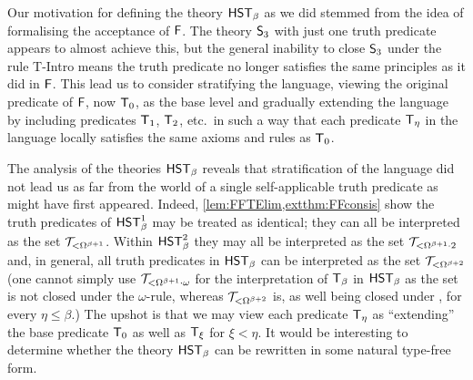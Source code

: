 \documentclass[UKenglish,cleveref,DIV=12]{scrartcl}
\theoremstyle{definition}
\theoremstyle{definition}
\begin{document}
Our motivation for defining the theory $\mathsf{HST}_\beta$ as we did stemmed from the
idea of formalising the acceptance of $\mathsf{F}$. The theory $\mathsf{S}_3$ with just one
truth predicate appears to almost achieve this, but the general inability
to close $\mathsf{S}_3$ under the rule T-Intro means the truth predicate no longer
satisfies the same principles as it did in $\mathsf{F}$. This lead us to consider
stratifying the language, viewing the original predicate of $\mathsf{F}$, now $\mathsf{T}_0$, as
the base level and gradually extending the language by including predicates
$\mathsf{T}_1$, $\mathsf{T}_2$, etc.~in such a way that each predicate $\mathsf{T}_\eta$ in the
language locally satisfies the same axioms and rules as $\mathsf{T}_0$.



The analysis of the theories $\mathsf{HST}_\beta$ reveals that stratification of the
language did not lead us as far from the world of a single self-applicable truth
predicate as might have first appeared. Indeed,
\cref{lem:FFTElim,extthm:FFconsis} show the truth predicates of $\mathsf{HST}_\beta^1$
may be treated as identical; they can all be interpreted as the set
$\mathcal{T}_{<\Omega^{\beta+1}}$. Within $\mathsf{HST}_\beta^2$ they may all be interpreted as the
set $\mathcal{T}_{<\Omega^{\beta+1}\cdot2}$ and, in general, all truth predicates in
$\mathsf{HST}_\beta$ can be interpreted as the set
$\mathcal{T}_{\mathord<\Omega^{\beta+2}}$ (one cannot simply use
$\mathcal{T}_{\mathord<\Omega^{\beta+1}\cdot\omega}$ for the interpretation of $\mathsf{T}_\beta$ in
$\mathsf{HST}_\beta$ as the set is not closed under the $\omega$-rule, whereas
$\mathcal{T}_{\mathord<\Omega^{\beta+2}}$ is, as well being closed under \Conec\eta, \Nec\eta for every $\eta\le\beta$.)
The upshot is that we may view each predicate $\mathsf{T}_\eta$ as ``extending'' the base predicate $\mathsf{T}_0$ as well as $\mathsf{T}_\xi$ for $\xi<\eta$. It would be interesting to determine whether the
theory $\mathsf{HST}_\beta$ can be rewritten in some natural type-free form.
\end{document}
